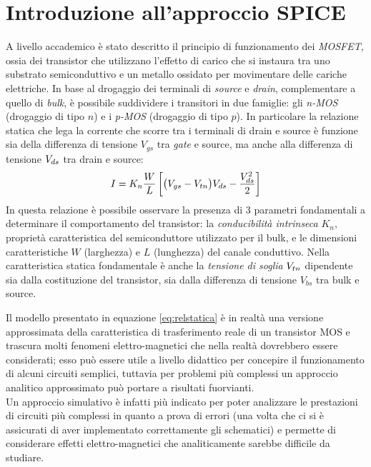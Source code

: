 \chapter{Introduzione all'approccio SPICE}
	
	A livello accademico è stato descritto il principio di funzionamento dei \textit{MOSFET}, ossia dei transistor che utilizzano l'effetto di carico che si instaura tra uno substrato semiconduttivo e un metallo ossidato per movimentare delle cariche elettriche. In base al drogaggio dei terminali di \textit{source} e \textit{drain}, complementare a quello di \textit{bulk}, è possibile suddividere i transitori in due famiglie: gli \textit{n-MOS} (drogaggio di tipo $n$) e i \textit{p-MOS} (drogaggio di tipo $p$). In particolare la relazione statica che lega la corrente che scorre tra i terminali di drain e source è funzione sia della differenza di tensione $V_{gs}$ tra \textit{gate} e source, ma anche alla differenza di tensione $V_{ds}$ tra drain e source:
	\begin{equation} \label{eq:relstatica}
		I = K_n \frac W L \left[ \big(V_{gs} - V_{tn}\big)V_{ds} - \frac{V_{ds}^2}{2} \right]
	\end{equation} 
	In questa relazione è possibile osservare la presenza di 3 parametri fondamentali a determinare il comportamento del transistor: la \textit{conducibilità intrinseca} $K_n$, proprietà caratteristica del semiconduttore utilizzato per il bulk, e le dimensioni caratteristiche $W$ (larghezza) e $L$ (lunghezza) del canale conduttivo. Nella caratteristica statica fondamentale è anche la \textit{tensione di soglia} $V_{tn}$ dipendente sia dalla costituzione del transistor, sia dalla differenza di tensione $V_{bs}$ tra bulk e source. 
	
	Il modello presentato in equazione \ref{eq:relstatica} è in realtà una versione approssimata della caratteristica di trasferimento reale di un transistor MOS e trascura molti fenomeni elettro-magnetici che nella realtà dovrebbero essere considerati; esso può essere utile a livello didattico per concepire il funzionamento di alcuni circuiti semplici, tuttavia per problemi più complessi un approccio analitico approssimato può portare a risultati fuorvianti. \\
	Un approccio simulativo è infatti più indicato per poter analizzare le prestazioni di circuiti più complessi in quanto a prova di errori (una volta che ci si è assicurati di aver implementato correttamente gli schematici) e permette di considerare effetti elettro-magnetici che analiticamente sarebbe difficile da studiare.
	
